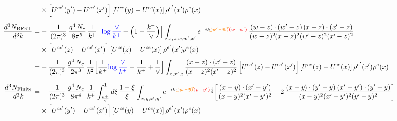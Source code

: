 \documentclass[9pt]{article}
\numberwithin{equation}{section}
\begin{document}
\begin{align}
&\times\left[U^{ce'}(y') - U^{ce'}(x')\right]\left[U^{ce}(y) - U^{ce}(x)\right]\rho^{e'}(x')\rho^{e}(x)\\[6pt]
\frac{d^{3}N_{\rm BFKL}}{d^{3}k}= &    +\,\frac{1}{(2\pi)^{3}}\,\frac{g^{4}\,N_{c}}{8\pi^{5}}\,\frac{1}{k^{+}}\,\Big[{\color{blue}\log\frac{\vee}{k^{+}}}-\Big(1-\frac{k^{+}}{\vee}\Big)\Big]\int_{x,z,w,w',x'}e^{-ik{\color{orange}\cancel{(w'-w)}}{\color{red}(w-w')}}\,\frac{(w-z)\cdot (w'-z)\,(x-z)\cdot (x'-z)}{(w-z)^{2}(x-z)^{2}(w'-z)^{2}(x'-z)^{2}}\notag\\
&\times\left[U^{ce'}(z) - U^{ce'}(x')\right]\left[U^{ce}(z) - U^{ce}(x)\right]\rho^{e'}(x') \rho^{e}(x)\notag \\
= & +\frac{1}{(2\pi)^{3}}\,\frac{g^{4}\,N_{c}}{2\pi^{3}}\,\frac{1}{k^{2}}\Big[\frac{1}{k^{+}}{\color{blue}\log\frac{\vee}{k^{+}}}-\frac{1}{k^{+}}+\frac{1}{\vee}\Big]\int_{x,x',z}\frac{(x-z)\cdot(x'-z)}{(x-z)^{2}(x'-z)^{2}}\left[U^{ce'}(z) - U^{ce'}(x')\right]\left[U^{ce}(z) - U^{ce}(x)\right]\rho^{e'}(x')\rho^{e}(x)\\[6pt]
\frac{d^{3}N_{\rm Finite}}{d^{3}k}= &  +\frac{1}{(2\pi)^{3}}\,\frac{g^{4}\,N_{c}}{8\pi^{4}}\,\frac{1}{k^{+}}\int_{\frac{k^{+}}{\vee}}^{1}d\xi\,\frac{1-\xi}{\xi}\int_{x,y,x',y'}e^{-ik\cdot{\color{orange}\cancel{(y'-y)}}{\color{red}(y-y')}\frac{1}{\xi}}\bigg[\frac{(x-y)\cdot(x'-y')}{(x-y)^{2}(x'-y')^{2}}-2\,\frac{(x-y)\cdot(y'-y)\;(x'-y')\cdot(y'-y)}{(x-y)^{2}(x'-y')^{2}(y'-y)^{2}}\bigg]\notag\\
&\times\left[U^{ce'}(y') - U^{ce'}(x')\right]\left[U^{ce}(y) - U^{ce}(x)\right]\rho^{e'}(x')\rho^{e}(x)
\end{align}
\end{document}

